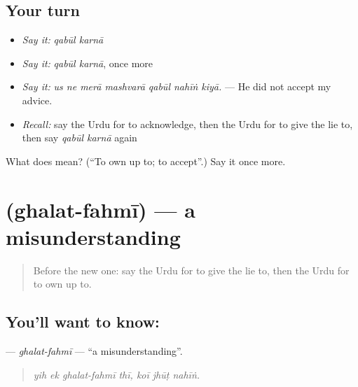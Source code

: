 \subsection*{Your turn}
\begin{itemize}
\raggedright
  \item \emph{Say it:} \emph{qabūl karnā}
  \item \emph{Say it:} \emph{qabūl karnā}, once more
  \item \emph{Say it:} \emph{us ne merā mashvarā qabūl nahīṅ kiyā.} — He did not accept my advice.
  \item \emph{Recall:} say the Urdu for to acknowledge, then the Urdu for to give the lie to, then say \emph{qabūl karnā} again
\end{itemize}

\begin{tcolorbox}[breakable,colback=teal!4,colframe=teal!35!black,title={Before you move on}]
What does   mean? (\textquotedblleft{}To own up to; to accept\textquotedblright{}.) Say it once more.
\end{tcolorbox}
\section[\texorpdfstring{\ur{غلط} \ur{فہمی} (ghalat-fahmī)}{غلط فہمی (ghalat-fahmī)}]{  (ghalat-fahmī) — a misunderstanding}

\label{lesson:UR-C337-ghalat-fahmi}



\begin{quote}
Before the new one: say the Urdu for to give the lie to, then the Urdu for to own up to.
\end{quote}

\subsection*{You'll want to know:  }
\textbf{ } — \emph{ghalat-fahmī} — \textquotedblleft{}a misunderstanding\textquotedblright{}.

\begin{quote}
       
\end{quote}

\begin{quote}
\emph{yih ek ghalat-fahmī thī, koī jhūṭ nahīṅ.}
\end{quote}

